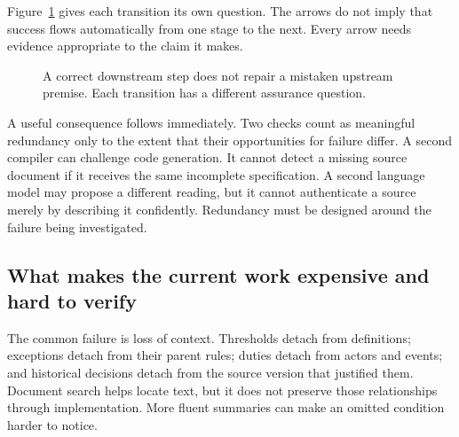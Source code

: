 \documentclass[12pt,a4paper,oneside,openany]{book}
\begin{document}
Figure~\ref{fig:assurance-chain} gives each transition its own question. The
arrows do not imply that success flows automatically from one stage to the next. Every
arrow needs evidence appropriate to the claim it makes.

\begin{figure}[htbp]
\centering
{}
\caption{A correct downstream step does not repair a mistaken upstream premise.
Each transition has a different assurance question.}
\label{fig:assurance-chain}
\end{figure}

A useful consequence follows immediately. Two checks count as meaningful
redundancy only to the extent that their opportunities for failure differ. A
second compiler can challenge code generation. It cannot detect a missing source
document if it receives the same incomplete specification. A second language
model may propose a different reading, but it cannot authenticate a source merely
by describing it confidently. Redundancy must be designed around the failure
being investigated.

\subsection{What makes the current work expensive and hard to verify}
\label{merge:P-01-problem:05}


The common failure is loss of context. Thresholds detach from definitions;
exceptions detach from their parent rules; duties detach from actors and events;
and historical decisions detach from the source version that justified them.
Document search helps locate text, but it does not preserve those relationships
through implementation. More fluent summaries can make an omitted condition
harder to notice.
\end{document}
